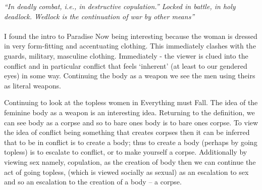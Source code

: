 
\textit{``In deadly combat, i.e., in destructive copulation.'' Locked in battle, in holy deadlock. Wedlock is the continuation of war by other means'' }

\paragraph{}

I found the intro to Paradise Now being interesting because the woman is dressed in very form-fitting and accentuating clothing. This immediately clashes with the guards, military, masculine clothing. Immediately - the viewer is clued into the conflict and in particular conflict that feels `inherent' (at least to our gendered eyes) in some way. Continuing the body as a weapon we see the men using theirs as literal weapons.  

Continuing to look at the topless women in Everything must Fall. The idea of the feminine body as a weapon is an interesting idea. Returning to the definition, we can see body as a corpse and so to bare ones body is to bare ones corpse. To view the idea of conflict being something that creates corpses then it can be inferred that to be in conflict is to create a body; thus to create a body (perhaps by going topless) is to escalate to conflict, or to make yourself a corpse. Additionally by viewing sex namely, copulation, as the creation of body then we can continue the act of going topless, (which is viewed socially as sexual) as an escalation to sex and so an escalation to the creation of a body  -- a corpse. 
